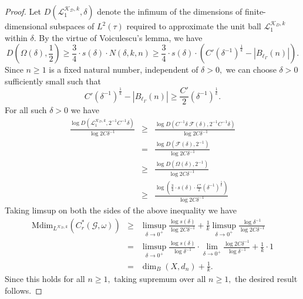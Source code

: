 \documentclass[a4paper,11pt,reqno]{amsart}
\theoremstyle{plain}
\theoremstyle{mainthmstyle}
\theoremstyle{named}
\numberwithin{equation}{section}
\newcommand{\Bea}{\begin{eqnarray*}}
\newcommand{\Eea}{\end{eqnarray*}}
\begin{document}
\begin{proof}
Let $D(\mathcal L^{\mathcal{K_D}, k}_1, \delta)$ denote the infimum of the dimensions of finite-dimensional subspaces of $L^2(\tau)$ required to approximate the unit ball $\mathcal L^{\mathcal{K}_D, k}_1$ within $\delta$. By the virtue of Voiculescu's lemma, we have
$$D \left (\Omega (\delta), \frac {1} {2} \right ) \geq \frac {3} {4} \cdot s (\delta) \cdot N(\delta, k, n) \geq \frac {3} {4} \cdot s (\delta) \cdot \left (C' \left (\delta^{-1} \right )^{\frac {1} {k}} - \left \lvert B_{\ell_{\Gamma}} (n) \right \rvert \right ).$$
Since $n \geq 1$ is a fixed natural number, independent of $\delta > 0,$ we can choose $\delta > 0$ sufficiently small such that $$C' \left (\delta^{-1} \right )^{\frac {1} {k}} - \left \lvert B_{\ell_{\Gamma}} (n) \right \rvert \geq \frac {C'} {2} \left (\delta^{-1} \right )^{\frac {1} {k}}.$$ For all such $\delta > 0$ we have
\Bea
\frac {\log D \left (\mathcal L^{\mathcal K_D, k}_1, 2^{-1} C^{-1} \delta \right )} {\log 2 C \delta^{-1}} & \geq & \frac {\log D \left (C^{-1} \delta\ \mathcal F (\delta), 2^{-1} C^{-1} \delta \right )} {\log 2 C \delta^{-1}} \\ & = & \frac {\log D \left (\mathcal F (\delta), 2^{-1} \right )} {\log 2 C \delta^{-1}} \\ & \geq & \frac {\log D \left (\Omega (\delta), 2^{-1} \right )} {\log 2 C \delta^{-1}} \\ & \geq & \frac {\log \left (\frac {3} {4} \cdot s (\delta) \cdot \frac {C'} {2} \left (\delta^{-1} \right )^{\frac {1} {k}} \right )} {\log 2 C \delta^{-1}}
\Eea
Taking limsup on both the sides of the above inequality we have
\Bea 
\mathrm {Mdim}_{L^{\mathcal K_D, k}} \left (C_r^{\ast} (\mathcal G, \omega) \right ) & \geq & \limsup\limits_{\delta \to 0^{+}} \frac {\log s (\delta)} {\log 2 C \delta^{-1}} + \frac {1} {k} \limsup\limits_{\delta \to 0^{+}} \frac {\log \delta^{-1}} {\log 2 C \delta^{-1}} \\ & = & \limsup\limits_{\delta \to 0^{+}} \frac {\log s (\delta)} {\log \delta^{-1}} \cdot \lim\limits_{\delta \to 0^{+}} \frac {\log 2 C \delta^{-1}} {\log \delta^{-1}} + \frac {1} {k} \cdot 1 \\ & = & \dim_{B} \left (X, d_n \right ) + \frac {1} {k}.
\Eea
Since this holds for all $n \geq 1,$ taking supremum over all $n \geq 1,$ the desired result follows.


\end{proof}
\end{document}
